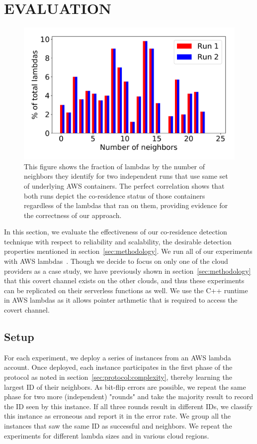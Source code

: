 \section{EVALUATION}
\label{sec:eval}

\begin{figure}[!t]
  \includegraphics[width=.99\linewidth]{fig/correlation.pdf}
  \caption{This figure shows the fraction of lambdas by the number of neighbors 
  they identify for two independent runs that use same set of underlying AWS
  containers. The perfect correlation shows that both runs depict the co-residence 
  status of those containers regardless of the lambdas that ran on them, providing
  evidence for the correctness of our approach.
\label{fig:correlation}}
\end{figure}

In this section, we evaluate the effectiveness of our co-residence detection
technique with respect to reliability and scalability, the desirable detection
properties mentioned in section~\ref{sec:methodology}.  We run all of our
experiments with AWS lambdas~\cite{awscloud}. Though we decide to focus on only
one of the cloud providers as a case study, we have previously shown in
section~\ref{sec:methodology} that this covert channel exists on the other
clouds, and thus these experiments can be replicated on their serverless
functions as well. We use the C++ runtime in AWS lambdas as it allows pointer
arthmetic that is required to access the covert channel.

\subsection{Setup}
\label{subsec:expsetup}
For each experiment, we deploy a series of instances from an AWS lambda
account. Once deployed, each instance participates in the first phase of the
protocol as noted in section~\ref{sec:protocol:complexity}, thereby learning the
largest ID of their neighbors. As bit-flip errors are possible, we repeat the
same phase for two more (independent) "rounds" and take the majority result to
record the ID seen by this instance.  If all three rounds result in different
IDs, we classify this instance as erroneous and report it in the error rate. We
group all the instances that saw the same ID as successful and neighbors. We
repeat the experiments for different lambda sizes and in various cloud regions.

